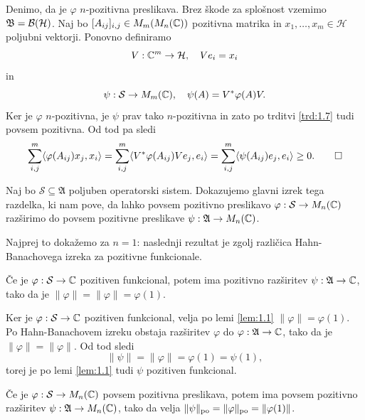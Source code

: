 \begin{dokaz}
    Denimo, da je $\varphi$ $n$-pozitivna preslikava. Brez škode za splošnost vzemimo $\mathfrak{B} = \operatorname{\mathcal{B} (\mathcal{H})}$.
    Naj bo $[A_{ij}]_{i, j} \in M_m (M_n (\mathbb C))$ pozitivna matrika in $x_1, \dots, x_m \in \mathcal{H}$ poljubni vektorji.
    Ponovno definiramo $$V: \mathbb C^m \to \mathcal{H},\quad V e_i = x_i$$ in
    $$\psi : \mathcal{S} \to M_m (\mathbb C),\quad \psi (A) = V^* \varphi(A) V.$$
    Ker je $\varphi$ $n$-pozitivna, je $\psi$ prav tako $n$-pozitivna in zato po trditvi \ref{trd:1.7} tudi povsem pozitivna.
    Od tod pa sledi 
    \begin{equation*}
        \sum_{i, j} ^m \langle \varphi (A_{ij}) x_j, x_i \rangle = \sum_{i, j} ^m \langle V^* \varphi (A_{ij}) V e_j, e_i \rangle = \sum_{i, j} ^m \langle \psi (A_{ij}) e_j, e_i \rangle \geq 0. \qedhere
    \end{equation*}
\end{dokaz}

Naj bo $\mathcal{S} \subseteq \mathfrak{A}$ poljuben operatorski sistem.
Dokazujemo glavni izrek tega razdelka, ki nam pove, da lahko povsem pozitivno preslikavo $\varphi: \mathcal{S} \to M_n (\mathbb C)$
razširimo do povsem pozitivne preslikave $\psi: \mathfrak{A} \to M_n (\mathbb C)$.

Najprej to dokažemo za $n = 1$: naslednji rezultat je zgolj različica Hahn-Banachovega izreka za pozitivne funkcionale.

\begin{lema}\label{lem:1.4}
    Če je $\varphi: \mathcal{S} \to \mathbb C$
    pozitiven funkcional, potem ima pozitivno razširitev $\psi: \mathfrak{A} \to \mathbb C$, 
    tako da je $\| \varphi \| = \| \varphi \| =  \varphi (1)$.
\end{lema}

\begin{dokaz}
    Ker je $\varphi: \mathcal{S} \to \mathbb C$ pozitiven funkcional, velja po lemi \ref{lem:1.1} $\| \varphi \| = \varphi (1)$.
    Po Hahn-Banachovem izreku obstaja razširitev $\varphi$ do $\varphi: \mathfrak{A} \to \mathbb C$,
    tako da je $\| \varphi \| = \| \varphi \|$. Od tod sledi 
    $$\| \psi \| = \| \varphi \| = \varphi (1) = \psi(1),$$
    torej je po lemi \ref{lem:1.1} tudi $\psi$ pozitiven funkcional.
\end{dokaz}

\begin{izrek}\label{izr:aux}
    Če je $\varphi: \mathcal{S} \to M_n (\mathbb C)$ povsem pozitivna preslikava,
    potem ima povsem pozitivno razširitev $\psi: \mathfrak{A} \to M_n (\mathbb C)$,
    tako da velja $\| \psi \|_{\operatorname{po}} = \| \varphi\|_{\operatorname{po}} = \| \varphi (1)\|$.
\end{izrek}

